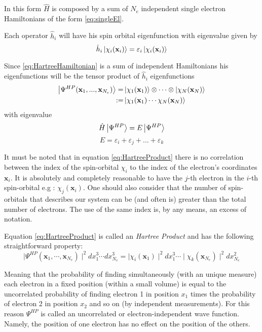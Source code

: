\documentclass[a4paper,12pt]{article}
\begin{document}
In this form $\hat{H}$ is composed by a sum of $N_e$ independent single electron Hamiltonians of the form \eqref{eq:singleEl}.

Each operator $\hat{h}_i$ will have his spin orbital eigenfunction with eigenvalue given by
\begin{equation}
	\hat{h}_{i} \ket{\chi_{i}(\mathbf{x}_i) } = \varepsilon_{i} \ket{\chi_{i}(\mathbf{x}_i) }
\end{equation}

Since \eqref{eq:HartreeHamiltonian} is a sum of independent Hamiltonians his eigenfunctions will be the tensor product of $\hat{h}_i$ eigenfunctions
\begin{align}\label{eq:HartreeProduct}
	\ket{\Psi^{HP}(\mathbf{x}_{1},...,\mathbf{x}_{N_e})} = & \ket{\chi_1(\mathbf{x}_{1})} \otimes \cdots  \otimes \ket{\chi_N(\mathbf{x}_{N})} \\
	:= & \ket{ \chi_{1}(\mathbf{x}_{1}) \cdots \chi_{N}(\mathbf{x}_{N}) }
\end{align}
with eigenvalue
\begin{equation}
	\hat{H}\ket{\Psi^{HP}} = E\ket{\Psi^{HP}}
\end{equation}
\begin{equation}
	E = \varepsilon_i + \varepsilon_j + ... + \varepsilon_k
\end{equation}

It must be noted that in equation \eqref{eq:HartreeProduct} there is no correlation between the index of the spin-orbital $\chi_{i}$ to the index of the electron's coordinates $\mathbf{x}_i$. It is absolutely and completely reasonable to have the $j$-th electron in the $i$-th spin-orbital e.g : $\chi_{j}(\mathbf{x}_{i})$.
One should also consider that the number of spin-orbitals that describes our system can be (and often is) greater than the total number of electrons. The use of the same index is, by any means, an excess of notation.


Equation \eqref{eq:HartreeProduct} is called an \textit{Hartree Product} and has the following straightforward property: 
\begin{equation}\label{eq:uncorrelated}
	\mid\Psi^{HP}(\mathbf{x}_1,\cdots,\mathbf{x}_{N_e}) \mid^2 dx_1^3 \cdots dx_{N_e}^3 = \mid\chi_i(\mathbf{x}_1)\mid^2 dx_1^3 \cdots \mid \chi_k(\mathbf{x}_{N_e})\mid^2 dx_{N_e}^2
\end{equation}

Meaning that the probability of finding simultaneously (with an unique measure) each electron in a fixed position (within a small volume) is equal to the uncorrelated probability of finding electron 1 in position $x_1$ times the probability of electron 2 in position $x_2$ and so on (by independent measurements).
For this reason $\Psi^{HP}$ is called an uncorrelated or electron-independent wave function. 
Namely, the position of one electron has no effect on the position of the others. 
\end{document}
